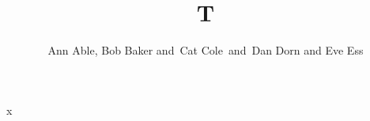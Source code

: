 \documentclass{article}
\newcommand{\atque}{{\normalfont\MakeLowercase{and\ \ignorespaces}}}
\newcommand{\et}{ \lowercase{AND} }
\begin{document}
\title{T}
\author{Ann Able, Bob Baker \atque Cat Cole~\atque Dan Dorn\et Eve Ess}
\maketitle
x
\end{document}

